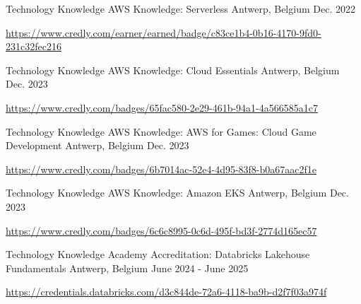 \begin{cventries}
\cventry
{Technology Knowledge} %
{AWS Knowledge: Serverless} %
{Antwerp, Belgium} %
{Dec. 2022} %
{
  \begin{cvitems} %
    \item \url{https://www.credly.com/earner/earned/badge/c83ce1b4-0b16-4170-9fd0-231c32fec216}
  \end{cvitems}
}

\cventry
{Technology Knowledge} %
{AWS Knowledge: Cloud Essentials} %
{Antwerp, Belgium} %
{Dec. 2023} %
{
  \begin{cvitems} %
    \item \url{https://www.credly.com/badges/65fac580-2e29-461b-94a1-4a566585a1c7}
  \end{cvitems}
}

\cventry
{Technology Knowledge} %
{AWS Knowledge: AWS for Games: Cloud Game Development} %
{Antwerp, Belgium} %
{Dec. 2023} %
{
  \begin{cvitems} %
    \item \url{https://www.credly.com/badges/6b7014ac-52e4-4d95-83f8-b0a67aac2f1e}
  \end{cvitems}
}

\cventry
{Technology Knowledge} %
{AWS Knowledge: Amazon EKS} %
{Antwerp, Belgium} %
{Dec. 2023} %
{
  \begin{cvitems} %
    \item \url{https://www.credly.com/badges/6c6c8995-0c6d-495f-bd3f-2774d165ec57}
  \end{cvitems}
}

\cventry
{Technology Knowledge} %
{Academy Accreditation: Databricks Lakehouse Fundamentals} %
{Antwerp, Belgium} %
{June 2024 - June 2025} %
{
  \begin{cvitems} %
    \item \url{https://credentials.databricks.com/d3c844de-72a6-4118-ba9b-d2f7f03a974f}
  \end{cvitems}
}

\end{cventries}
